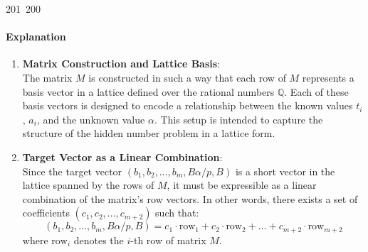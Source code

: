 201~200~\documentclass{article}
\begin{document}
	                                                                        	                                                \paragraph{Explanation}
	                                                                        	                                                \begin{enumerate}
	                                                                        	                                                    \item \textbf{Matrix Construction and Lattice Basis}: \\
	                                                                        	                                                        The matrix \(M\) is constructed in such a way that each row of \(M\) represents a basis vector in a lattice defined over the rational numbers \(\mathbb{Q}\). Each of these basis vectors is designed to encode a relationship between the known values \(t_i\), \(a_i\), and the unknown value \(\alpha\). This setup is intended to capture the structure of the hidden number problem in a lattice form.

	                                                                        	                                                            \item \textbf{Target Vector as a Linear Combination}: \\
	                                                                        	                                                                Since the target vector \((b_1, b_2, \ldots, b_m, B\alpha/p, B)\) is a short vector in the lattice spanned by the rows of \(M\), it must be expressible as a linear combination of the matrix's row vectors. In other words, there exists a set of coefficients \((c_1, c_2, \ldots, c_{m+2})\) such that:
	                                                                        	                                                                    \[
	                                                                        	                                                                    	    (b_1, b_2, \ldots, b_m, B\alpha/p, B) = c_1 \cdot \text{row}_1 + c_2 \cdot \text{row}_2 + \ldots + c_{m+2} \cdot \text{row}_{m+2}
	                                                                        	                                                                    	        \]
	                                                                        	                                                                    	            where \(\text{row}_i\) denotes the \(i\)-th row of matrix \(M\).


\end{enumerate}
\end{document}
